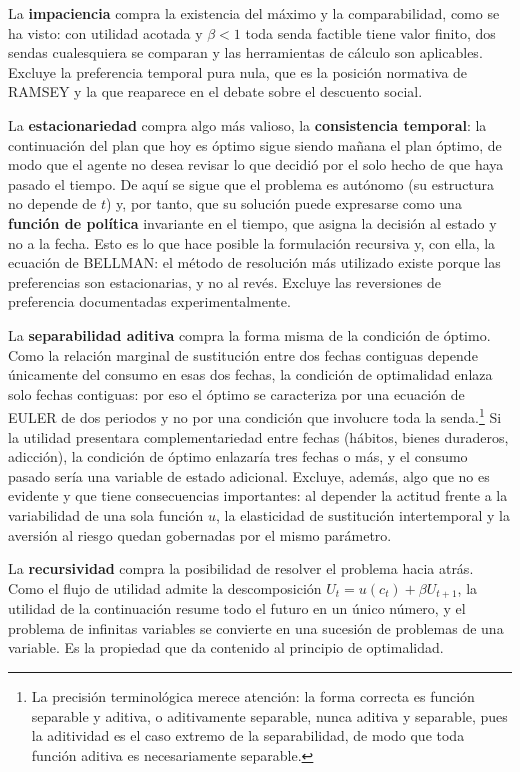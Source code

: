 \documentclass[10pt,a4paper]{article}
\begin{document}
La \textbf{impaciencia} compra la existencia del máximo y la comparabilidad, como se ha visto: con utilidad acotada y $\beta<1$ toda senda factible tiene valor finito, dos sendas cualesquiera se comparan y las herramientas de cálculo son aplicables. Excluye la preferencia temporal pura nula, que es la posición normativa de RAMSEY y la que reaparece en el debate sobre el descuento social.

La \textbf{estacionariedad} compra algo más valioso, la \textbf{consistencia temporal}: la continuación del plan que hoy es óptimo sigue siendo mañana el plan óptimo, de modo que el agente no desea revisar lo que decidió por el solo hecho de que haya pasado el tiempo. De aquí se sigue que el problema es autónomo (su estructura no depende de $t$) y, por tanto, que su solución puede expresarse como una \textbf{función de política} invariante en el tiempo, que asigna la decisión al estado y no a la fecha. Esto es lo que hace posible la formulación recursiva y, con ella, la ecuación de BELLMAN: el método de resolución más utilizado existe porque las preferencias son estacionarias, y no al revés. Excluye las reversiones de preferencia documentadas experimentalmente.

La \textbf{separabilidad aditiva} compra la forma misma de la condición de óptimo. Como la relación marginal de sustitución entre dos fechas contiguas depende únicamente del consumo en esas dos fechas, la condición de optimalidad enlaza solo fechas contiguas: por eso el óptimo se caracteriza por una ecuación de EULER de dos periodos y no por una condición que involucre toda la senda.\footnote{%
    La precisión terminológica merece atención: la forma correcta es función separable y aditiva, o aditivamente separable, nunca aditiva y separable, pues la aditividad es el caso extremo de la separabilidad, de modo que toda función aditiva es necesariamente separable.
} Si la utilidad presentara complementariedad entre fechas (hábitos, bienes duraderos, adicción), la condición de óptimo enlazaría tres fechas o más, y el consumo pasado sería una variable de estado adicional. Excluye, además, algo que no es evidente y que tiene consecuencias importantes: al depender la actitud frente a la variabilidad de una sola función $u$, la elasticidad de sustitución intertemporal y la aversión al riesgo quedan gobernadas por el mismo parámetro.

La \textbf{recursividad} compra la posibilidad de resolver el problema hacia atrás. Como el flujo de utilidad admite la descomposición $U_t=u(c_t)+\beta U_{t+1}$, la utilidad de la continuación resume todo el futuro en un único número, y el problema de infinitas variables se convierte en una sucesión de problemas de una variable. Es la propiedad que da contenido al principio de optimalidad.
\end{document}
